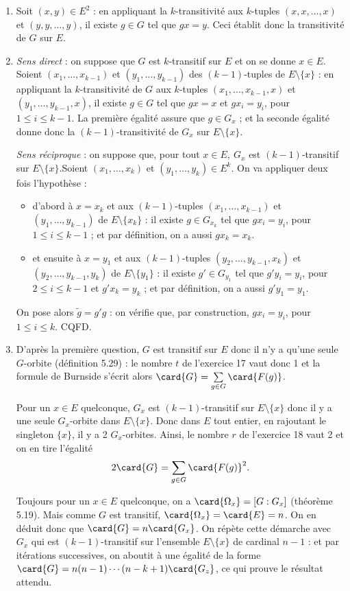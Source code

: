 
\begin{enumerate}
  \item Soit $(x,y)\in E^2$ : en appliquant la $k$-transitivité aux $k$-tuples $(x,x,\ldots,x)$ et $(y,y,\ldots, y)$, il existe $g \in G$ tel que $gx = y$. Ceci établit donc la transitivité de $G$ sur $E$.
  \item \emph{Sens direct} : on suppose que $G$ est $k$-transitif sur $E$ et on se donne $x\in E$. Soient $(x_1,\ldots, x_{k-1})$ et $(y_1,\ldots, y_{k-1})$ des $(k-1)$-tuples de $E\setminus\{x\}$ : en appliquant la $k$-transitivité de $G$ aux $k$-tuples  $(x_1,\ldots, x_{k-1},x)$ et $(y_1,\ldots, y_{k-1},x)$, il existe $g\in G$ tel que $gx=x$ et $gx_i = y_i$, pour $1\leq i\leq k-1$. La première égalité assure que $g\in G_x$ ; et la seconde égalité donne donc la $(k-1)$-transitivité de $G_x$ sur $E\setminus\{x\}$.

  \emph{Sens réciproque} : on suppose que, pour tout $x\in E,~ G_x$ est $(k-1)$-transitif sur $E\setminus\{x\}$.Soient $(x_1,\ldots, x_{k})$ et $(y_1,\ldots, y_{k}) \in E^k$. On va appliquer deux fois l'hypothèse :
  \begin{itemize}
   \item d'abord à $x=x_k$ et aux $(k-1)$-tuples $(x_1,\ldots, x_{k-1})$ et $(y_1,\ldots, y_{k-1})$ de $E\setminus\{x_k\}$ : il existe $g\in G_{x_k}$ tel que $gx_i = y_i$, pour $1\leq i\leq k-1$ ; et par définition, on a aussi $gx_k = x_k$.
   \item et ensuite à $x=y_1$ et aux $(k-1)$-tuples $(y_2,\ldots, y_{k-1},x_k)$ et $(y_2,\ldots, y_{k-1},y_k)$ de $E\setminus\{y_1\}$ :  il existe $g'\in G_{y_1}$ tel que $g'y_i = y_i$, pour $2\leq i\leq k-1$ et  $g'x_k = y_k$ ; et par définition, on a aussi $g'y_1 = y_1$.
  \end{itemize}
  On pose alors $\tilde{g} = g' g$ : on vérifie que, par construction, $gx_i = y_i$, pour $1\leq i\leq k$. CQFD.

  \item D'après la première question, $G$ est transitif sur $E$ donc il n'y a qu'une seule $G$-orbite (définition 5.29) : le nombre $t$ de l'exercice 17 vaut donc 1 et la formule de Burnside s'écrit alors $\card{G} =\sum\limits_{g\in G} \card{F(g)}$.

  Pour un $x\in E$ quelconque, $G_x$ est $(k-1)$-transitif sur $E\setminus\{x\}$ donc il y a une seule $G_x$-orbite dans $E\setminus\{x\}$. Donc dans $E$ tout entier, en rajoutant le singleton $\{x\}$, il y a 2 $G_x$-orbites. Ainsi, le nombre $r$ de l'exercice 18 vaut 2 et on en tire l'égalité
         \[
          2 \card{G} = \sum_{g\in G} \card{F(g)}^2.
        \]


  Toujours pour un $x\in E$ quelconque, on a $\card{\Omega_x} = [G:G_x]$ (théorème 5.19). Mais comme $G$ est transitif, $\card{\Omega_x} = \card{E} = n$. On en déduit donc que $\card{G} = n \card{G_x}$. On répète cette démarche avec $G_x$ qui est $(k-1)$-transitif sur l'ensemble $E\setminus\{x\}$ de cardinal $n-1$ : et par itérations successives, on aboutit à une égalité de la forme $\card{G} =n(n-1)\cdots(n-k+1)\card{G_z}$, ce qui prouve le résultat attendu.
\end{enumerate}
